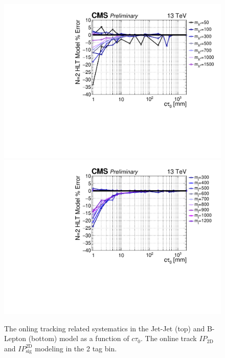 \begin{figure}
\begin{center}
\includegraphics[width=.70\textwidth]{figures/an/SYSTEMATICS/76x_pu/sys_2tag_hlt.pdf}
\includegraphics[width=.70\textwidth]{figures/an/SYSTEMATICS/76x_pu/sys_2tag_hlt_dsusy.pdf}
\caption{The onling tracking related systematics in the Jet-Jet (top) and B-Lepton
 (bottom)  model as a function of $c\tau_0$. The online track $IP_{\textrm{2D}}$ 
and $IP_{\textrm{sig}}^{\textrm{2D}}$ modeling in the 2 tag bin.
 \label{fig:online_tracking_sys}}
\end{center}
\end{figure}


